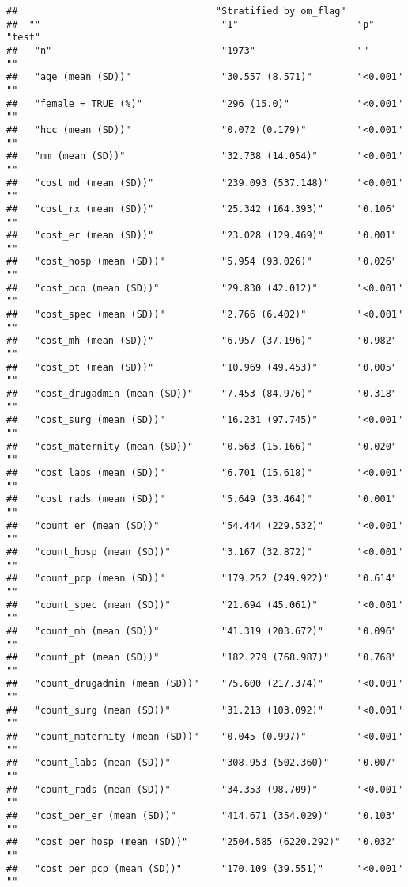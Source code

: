 \documentclass[]{article}
\begin{document}
\begin{verbatim}
##                                   "Stratified by om_flag"
##  ""                                "1"                     "p"      "test"
##   "n"                              "1973"                  ""       ""    
##   "age (mean (SD))"                "30.557 (8.571)"        "<0.001" ""    
##   "female = TRUE (%)"              "296 (15.0)"            "<0.001" ""    
##   "hcc (mean (SD))"                "0.072 (0.179)"         "<0.001" ""    
##   "mm (mean (SD))"                 "32.738 (14.054)"       "<0.001" ""    
##   "cost_md (mean (SD))"            "239.093 (537.148)"     "<0.001" ""    
##   "cost_rx (mean (SD))"            "25.342 (164.393)"      "0.106"  ""    
##   "cost_er (mean (SD))"            "23.028 (129.469)"      "0.001"  ""    
##   "cost_hosp (mean (SD))"          "5.954 (93.026)"        "0.026"  ""    
##   "cost_pcp (mean (SD))"           "29.830 (42.012)"       "<0.001" ""    
##   "cost_spec (mean (SD))"          "2.766 (6.402)"         "<0.001" ""    
##   "cost_mh (mean (SD))"            "6.957 (37.196)"        "0.982"  ""    
##   "cost_pt (mean (SD))"            "10.969 (49.453)"       "0.005"  ""    
##   "cost_drugadmin (mean (SD))"     "7.453 (84.976)"        "0.318"  ""    
##   "cost_surg (mean (SD))"          "16.231 (97.745)"       "<0.001" ""    
##   "cost_maternity (mean (SD))"     "0.563 (15.166)"        "0.020"  ""    
##   "cost_labs (mean (SD))"          "6.701 (15.618)"        "<0.001" ""    
##   "cost_rads (mean (SD))"          "5.649 (33.464)"        "0.001"  ""    
##   "count_er (mean (SD))"           "54.444 (229.532)"      "<0.001" ""    
##   "count_hosp (mean (SD))"         "3.167 (32.872)"        "<0.001" ""    
##   "count_pcp (mean (SD))"          "179.252 (249.922)"     "0.614"  ""    
##   "count_spec (mean (SD))"         "21.694 (45.061)"       "<0.001" ""    
##   "count_mh (mean (SD))"           "41.319 (203.672)"      "0.096"  ""    
##   "count_pt (mean (SD))"           "182.279 (768.987)"     "0.768"  ""    
##   "count_drugadmin (mean (SD))"    "75.600 (217.374)"      "<0.001" ""    
##   "count_surg (mean (SD))"         "31.213 (103.092)"      "<0.001" ""    
##   "count_maternity (mean (SD))"    "0.045 (0.997)"         "<0.001" ""    
##   "count_labs (mean (SD))"         "308.953 (502.360)"     "0.007"  ""    
##   "count_rads (mean (SD))"         "34.353 (98.709)"       "<0.001" ""    
##   "cost_per_er (mean (SD))"        "414.671 (354.029)"     "0.103"  ""    
##   "cost_per_hosp (mean (SD))"      "2504.585 (6220.292)"   "0.032"  ""    
##   "cost_per_pcp (mean (SD))"       "170.109 (39.551)"      "<0.001" ""    

\end{verbatim}
\end{document}
